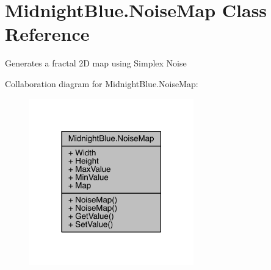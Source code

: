 \hypertarget{class_midnight_blue_1_1_noise_map}{}\section{Midnight\+Blue.\+Noise\+Map Class Reference}
\label{class_midnight_blue_1_1_noise_map}


Generates a fractal 2D map using Simplex Noise  




Collaboration diagram for Midnight\+Blue.\+Noise\+Map\+:
\nopagebreak
\begin{figure}[H]
\begin{center}
\leavevmode
\includegraphics[width=202pt]{class_midnight_blue_1_1_noise_map__coll__graph}
\end{center}
\end{figure}
